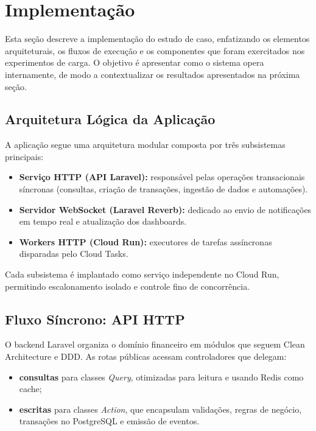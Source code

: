 \section{Implementação}
\label{sec:implementacao}

Esta seção descreve a implementação do estudo de caso, enfatizando os elementos arquiteturais,
os fluxos de execução e os componentes que foram exercitados nos experimentos de carga.
O objetivo é apresentar como o sistema opera internamente, de modo a contextualizar
os resultados apresentados na próxima seção.

\subsection{Arquitetura Lógica da Aplicação}

A aplicação segue uma arquitetura modular composta por três subsistemas principais:

\begin{itemize}
    \item \textbf{Serviço HTTP (API Laravel):} responsável pelas operações transacionais
        síncronas (consultas, criação de transações, ingestão de dados e automações).
    \item \textbf{Servidor WebSocket (Laravel Reverb):} dedicado ao envio de notificações
        em tempo real e atualização dos dashboards.
    \item \textbf{Workers HTTP (Cloud Run):} executores de tarefas assíncronas disparadas
        pelo Cloud Tasks.
\end{itemize}

Cada subsistema é implantado como serviço independente no Cloud Run, permitindo escalonamento
isolado e controle fino de concorrência.

\subsection{Fluxo Síncrono: API HTTP}

O backend Laravel organiza o domínio financeiro em módulos que seguem Clean Architecture
e DDD. As rotas públicas acessam controladores que delegam:

\begin{itemize}
    \item \textbf{consultas} para classes \textit{Query}, otimizadas para leitura
        e usando Redis como cache;
    \item \textbf{escritas} para classes \textit{Action}, que encapsulam validações,
        regras de negócio, transações no PostgreSQL e emissão de eventos.
\end{itemize}

